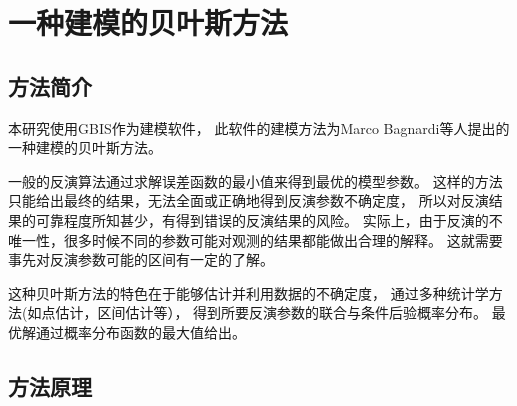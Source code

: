 \chapter{一种建模的贝叶斯方法}
\label{ch:pm}
\section{方法简介}
本研究使用GBIS作为建模软件，
此软件的建模方法为Marco Bagnardi等人提出的一种建模的贝叶斯方法。

一般的反演算法通过求解误差函数的最小值来得到最优的模型参数。
这样的方法只能给出最终的结果，无法全面或正确地得到反演参数不确定度，
所以对反演结果的可靠程度所知甚少，有得到错误的反演结果的风险。
实际上，由于反演的不唯一性，很多时候不同的参数可能对观测的结果都能做出合理的解释。
这就需要事先对反演参数可能的区间有一定的了解。

这种贝叶斯方法的特色在于能够估计并利用数据的不确定度，
通过多种统计学方法(如点估计，区间估计等），
得到所要反演参数的联合与条件后验概率分布。
最优解通过概率分布函数的最大值给出。

\section{方法原理}

